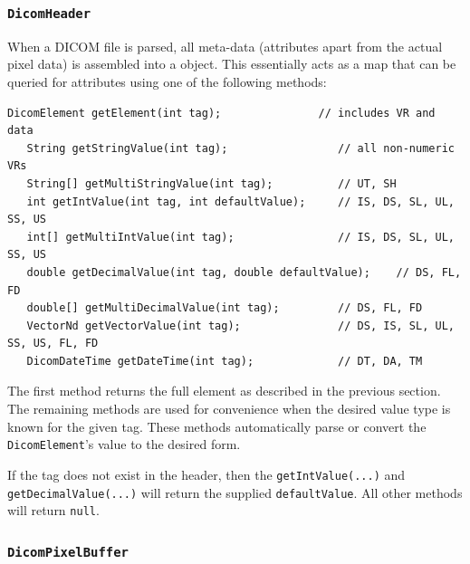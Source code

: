 \subsubsection{\texttt{DicomHeader}}

When a DICOM file is parsed, all meta-data (attributes apart from the actual pixel data) 
is assembled into a  object.  This essentially acts
as a map that can be queried for attributes using one of the following methods:
\begin{lstlisting}[]
   DicomElement getElement(int tag);               // includes VR and data
   String getStringValue(int tag);                 // all non-numeric VRs
   String[] getMultiStringValue(int tag);          // UT, SH
   int getIntValue(int tag, int defaultValue);     // IS, DS, SL, UL, SS, US
   int[] getMultiIntValue(int tag);                // IS, DS, SL, UL, SS, US
   double getDecimalValue(int tag, double defaultValue);    // DS, FL, FD
   double[] getMultiDecimalValue(int tag);         // DS, FL, FD
   VectorNd getVectorValue(int tag);               // DS, IS, SL, UL, SS, US, FL, FD
   DicomDateTime getDateTime(int tag);             // DT, DA, TM
\end{lstlisting}
The first method returns the full element as described in the previous section.  
The remaining methods are used for convenience when the desired value type is known for the given tag.  
These methods automatically parse or convert the \lstinline{DicomElement}'s value to the desired form.

If the tag does not exist in the header, then the \lstinline{getIntValue(...)} and
\lstinline{getDecimalValue(...)} will return the supplied \lstinline{defaultValue}.  All other methods
will return \lstinline{null}.

\subsubsection{\texttt{DicomPixelBuffer}}

